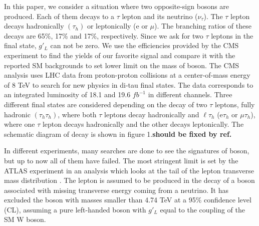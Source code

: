 In this paper, we consider a situation where two opposite-sign \wprime bosons are produced. Each of them decays to a $\tau$ lepton and its neutrino ($\nu_{\tau}$). The $\tau$ lepton decays hadronically $(\tau_h)$  or leptonically (e or $\mu$). The branching ratios of these decays are 65\%, 17\% and 17\%, respectively. Since we ask for two $\tau$ leptons in the final state, $g'_L$ can not be zero. 
We use the efficiencies provided by the CMS experiment \cite{Khachatryan:2016trj} to find the yields of our favorite signal and compare it with the reported SM backgrounds to set lower limit on the mass of \wprime boson. 
The CMS analysis uses LHC data from proton-proton collisions at a center-of-mass energy of 8 TeV to search for new physics in di-tau final states.  The data corresponds to an integrated luminosity of 18.1 and 19.6 $fb^{-1}$ in different channels. Three different final states are considered depending on the decay of two $\tau$ leptons, fully hadronic $(\tau_h \tau_h)$, where both $\tau$ leptons decay hadronically and $\ell\tau_h$ (e$\tau_h$ or $\mu\tau_h$), where one $\tau$ lepton decays hadronically and the other decays leptonically. The schematic diagram of decay is shown in figure 1.{\bf should be fixed by ref.}

In different experiments, many searches are done to see the signatures of \wprime boson, but up to now all of them have failed. The most stringent limit is set by the ATLAS experiment in an analysis which looks at the tail of the lepton transverse mass distribution \cite{ATLAS:2016ecs}. The lepton is assumed to be produced in the decay of a \wprime boson associated with missing transverse energy coming from a neutrino. It has excluded the \wprime boson with masses smaller than 4.74 TeV at a 95\% confidence level (CL), assuming a pure left-handed \wprime boson with $g'_L$ equal to the coupling of the SM W boson. 